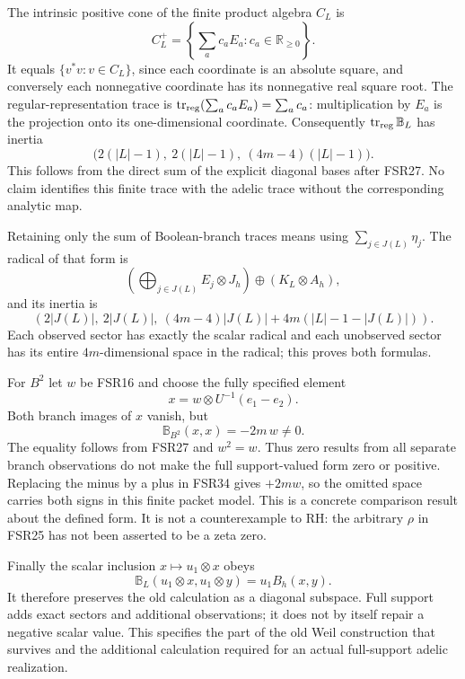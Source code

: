 \documentclass[
  10pt,
  a4paper,
]{article}
\begin{document}
The intrinsic positive cone of the finite product algebra \(C_L\) is \[
C_L^+=\left\{\sum_a c_a E_a:c_a\in\mathbb R_{\ge0}\right\}.
\tag{FSR30}
\] It equals \(\{v^*v:v\in C_L\}\), since each coordinate is an absolute
square, and conversely each nonnegative coordinate has its nonnegative
real square root. The regular-representation trace is
\(\operatorname{tr}_{\rm reg}(\sum_a c_a E_a)=\sum_a c_a\):
multiplication by \(E_a\) is the projection onto its one-dimensional
coordinate. Consequently \(\operatorname{tr}_{\rm reg}\mathbb B_L\) has
inertia \[
\bigl(2(|L|-1),\ 2(|L|-1),\ (4m-4)(|L|-1)\bigr).
\tag{FSR31}
\] This follows from the direct sum of the explicit diagonal bases after
FSR27. No claim identifies this finite trace with the adelic trace
without the corresponding analytic map.

Retaining only the sum of Boolean-branch traces means using
\(\sum_{j\in J(L)}\eta_j\). The radical of that form is \[
\left(\bigoplus_{j\in J(L)}E_j\otimes J_h\right)
\oplus\left(K_L\otimes A_h\right),
\tag{FSR32}
\] and its inertia is \[
\left(2|J(L)|,\ 2|J(L)|,\ (4m-4)|J(L)|+4m(|L|-1-|J(L)|)\right).
\tag{FSR33}
\] Each observed sector has exactly the scalar radical and each
unobserved sector has its entire \(4m\)-dimensional space in the
radical; this proves both formulas.

For \(B^2\) let \(w\) be FSR16 and choose the fully specified element \[
x=w\otimes U^{-1}(e_1-e_2).
\tag{FSR34}
\] Both branch images of \(x\) vanish, but \[
\mathbb B_{B^2}(x,x)=-2m\,w\neq0.
\tag{FSR35}
\] The equality follows from FSR27 and \(w^2=w\). Thus zero results from
all separate branch observations do not make the full support-valued
form zero or positive. Replacing the minus by a plus in FSR34 gives
\(+2m w\), so the omitted space carries both signs in this finite packet
model. This is a concrete comparison result about the defined form. It
is not a counterexample to RH: the arbitrary \(\rho\) in FSR25 has not
been asserted to be a zeta zero.

Finally the scalar inclusion \(x\mapsto u_1\otimes x\) obeys \[
\mathbb B_L(u_1\otimes x,u_1\otimes y)=u_1 B_h(x,y).
\tag{FSR36}
\] It therefore preserves the old calculation as a diagonal subspace.
Full support adds exact sectors and additional observations; it does not
by itself repair a negative scalar value. This specifies the part of the
old Weil construction that survives and the additional calculation
required for an actual full-support adelic realization.
\end{document}
